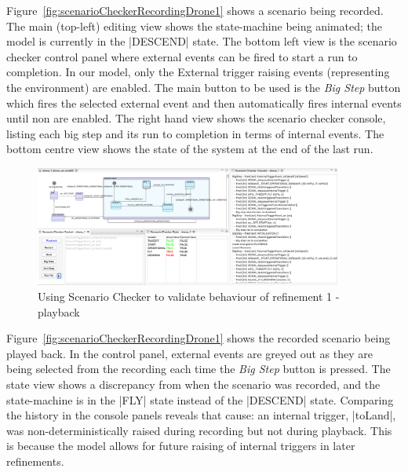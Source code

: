 Figure~\ref{fig:scenarioCheckerRecordingDrone1} shows a scenario being recorded.
The main (top-left) editing view shows the state-machine being animated; the model is currently in the |DESCEND| state.
The bottom left view is the scenario checker control panel where external events can be fired to start a run to completion.
In our model, only the External trigger raising events (representing the environment) are enabled.
The main button to be used is the \emph{Big Step} button which fires the selected external event and then automatically fires internal events until non are enabled.
The right hand view shows the scenario checker console, listing each big step and its run to completion in terms of internal events.
The bottom centre view shows the state of the system at the end of the last run.

\begin{figure}[!th]
	\centering
	\includegraphics[width=0.90\textwidth, trim=30 50 60 0]{figures/scenarioChecker_playback_drone1.png}
	\caption{Using Scenario Checker to validate behaviour of refinement 1 - playback }
	\label{fig:scenarioCheckerPlaybackDrone1}
\end{figure}

Figure~\ref{fig:scenarioCheckerRecordingDrone1} shows the recorded scenario being played back.
In the control panel, external events are greyed out as they are being selected from the recording each time the \emph{Big Step} button is pressed. 
The state view shows a discrepancy from when the scenario was recorded, and the state-machine is in the |FLY| state instead of the |DESCEND| state.
Comparing the history in the console panels reveals that cause: an internal trigger, |toLand|, was non-deterministically raised during recording but not during playback.
This is because the model allows for future raising of internal triggers in later refinements.

